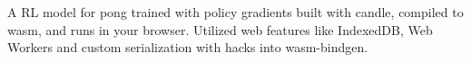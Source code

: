 {A RL model for pong trained with policy gradients built with candle, compiled to wasm, and runs in your browser. Utilized web features like IndexedDB, Web Workers and custom serialization with hacks into wasm-bindgen.}
